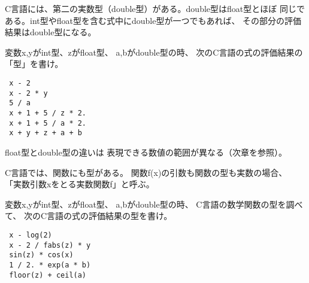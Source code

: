 \documentclass[12pt,a4j]{jarticle}
\newcounter{toi}
\def\toi{%
\bigskip\bigskip\noindent
\addtocounter{toi}{1}
\shadowbox{\bfseries\large 問\thetoi}
\nopagebreak[4]\bigskip\nopagebreak[4]
}
\begin{document}





\toi

\begin{multicols}{2}
 
 C言語には、第二の実数型（double型）がある。double型はfloat型とほぼ
 同じである。int型やfloat型を含む式中にdouble型が一つでもあれば、
 その部分の評価結果はdouble型になる。


 変数{\ttfamily x,y}がint型、{\ttfamily z}がfloat型、
 {\ttfamily a,b}がdouble型の時、
 次のC言語の式の評価結果の「型」を書け。

 \vfill

 \begin{verbatim}
 x - 2
 x - 2 * y
 5 / a
 x + 1 + 5 / z * 2.
 x + 1 + 5 / a * 2.
 x + y + z + a + b
 \end{verbatim}
\end{multicols}

float型とdouble型の違いは
表現できる数値の範囲が異なる（次章を参照）。







\newpage

\toi

\begin{multicols}{2}
 
 C言語では、関数にも型がある。
 関数{\ttfamily f(x)}の引数も関数の型も実数の場合、
 「実数引数{\ttfamily x}をとる実数関数{\ttfamily f}」と呼ぶ。


 変数{\ttfamily x,y}がint型、{\ttfamily z}がfloat型、
 {\ttfamily a,b}がdouble型の時、
 C言語の数学関数の型を調べて、
 次のC言語の式の評価結果の型を書け。

 \vfill

 \begin{verbatim}
 x - log(2)
 x - 2 / fabs(z) * y
 sin(z) * cos(x)
 1 / 2. * exp(a * b)
 floor(z) + ceil(a)
 \end{verbatim}
\end{multicols}

\end{document}
